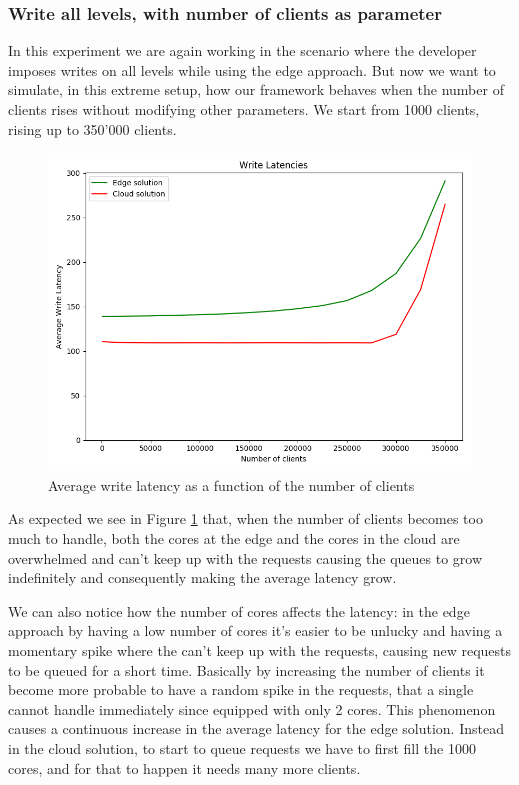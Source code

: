 \subsubsection{Write all levels, with number of clients as parameter}
In this experiment we are again working in the scenario where the developer imposes writes on all levels while using the edge approach. But now we want to simulate, in this extreme setup, how our framework behaves when the number of clients rises without modifying other parameters.
We start from 1000 clients, rising up to 350'000 clients.

\begin{figure}[H]
    \centering
    \includegraphics[width=0.95\linewidth]{Figures/Evaluation/write-all-clients-latency.png}
    \caption{Average write latency as a function of the number of clients}
    \label{fig:/write-all-clients-latency}
\end{figure}

As expected we see in Figure \ref{fig:/write-all-clients-latency} that, when the number of clients becomes too much to handle, both the cores at the edge and the cores in the cloud are overwhelmed and can't keep up with the requests causing the queues to grow indefinitely and consequently making the average latency grow.

We can also notice how the number of cores affects the latency: in the edge approach by having a low number of cores it's easier to be unlucky and having a momentary spike where the  can't keep up with the requests, causing new requests to be queued for a short time. Basically by increasing the number of clients it become more probable to have a random spike in the requests, that a single  cannot handle immediately since equipped with only 2 cores. This phenomenon causes a continuous increase in the average latency for the edge solution.
Instead in the cloud solution, to start to queue requests we have to first fill the 1000 cores, and for that to happen it needs many more clients.

